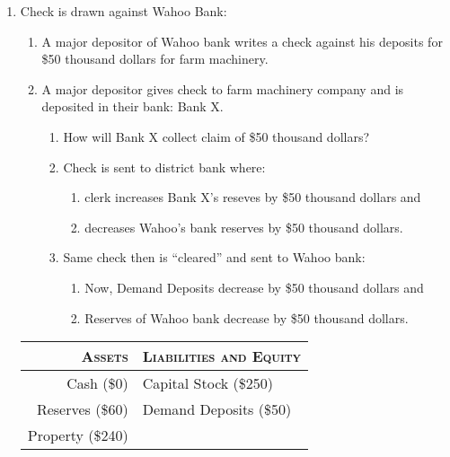 \begin{enumerate}[label = \textbf{(\arabic*)}]
\begin{enumerate}[label = (\alph*)]
		\end{enumerate}

	\item Check is drawn against Wahoo Bank:

		\begin{enumerate}[label = (\alph*)]
			\item A major depositor of Wahoo bank writes a check against his deposits for \$50 thousand dollars for farm machinery.

			\item A major depositor gives check to farm machinery company and is deposited in their bank: Bank X.

				\begin{enumerate}[label = (\roman*)]
					\item How will Bank X collect claim of \$50 thousand dollars?

					\item Check is sent to district bank where:

						 \begin{enumerate}[label = (\alph*)]
							 \item clerk increases Bank X's reseves by \$50 thousand dollars and
							 \item decreases Wahoo's bank reserves by \$50 thousand dollars.
						\end{enumerate}

					\item Same check then is ``cleared'' and sent to Wahoo bank:
						
						\begin{enumerate}[label = (\alph*)]
							\item Now, Demand Deposits decrease by \$50 thousand dollars and
							\item Reserves of Wahoo bank decrease by \$50 thousand dollars.
						\end{enumerate}
				\end{enumerate}
		\end{enumerate}
		
		\begin{center}
			\vspace{1em}
			\begin{tabular}{r|l}\toprule
				\textsc{Assets}			& \textsc{Liabilities and Equity}	\\ \midrule
				Cash (\$0)				& Capital Stock (\$250)				\\ 
				Reserves (\$60)			& Demand Deposits (\$50)			\\ 
				Property (\$240)		& 									\\ \bottomrule
			\end{tabular}
			\vspace{1em}
		\end{center}

\end{enumerate}


